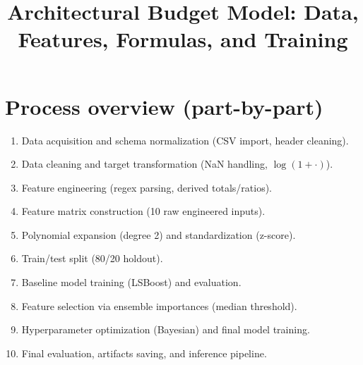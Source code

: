 \documentclass[11pt]{article}
\title{Architectural Budget Model: Data, Features, Formulas, and Training}
\author{}
\date{}
\begin{document}
\maketitle

\section*{Process overview (part-by-part)}
\begin{enumerate}[label=Part~\arabic*:, leftmargin=*]
  \item Data acquisition and schema normalization (CSV import, header cleaning).
  \item Data cleaning and target transformation (NaN handling, $\log(1+\cdot)$).
  \item Feature engineering (regex parsing, derived totals/ratios).
  \item Feature matrix construction (10 raw engineered inputs).
  \item Polynomial expansion (degree 2) and standardization (z-score).
  \item Train/test split (80/20 holdout).
  \item Baseline model training (LSBoost) and evaluation.
  \item Feature selection via ensemble importances (median threshold).
  \item Hyperparameter optimization (Bayesian) and final model training.
  \item Final evaluation, artifacts saving, and inference pipeline.
\end{enumerate}
\end{document}
